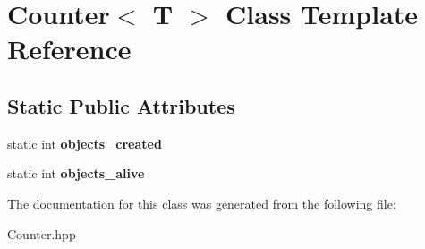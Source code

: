\hypertarget{class_counter}{}\section{Counter$<$ T $>$ Class Template Reference}
\label{class_counter}
\subsection*{Static Public Attributes}
\begin{DoxyCompactItemize}
\item 
\mbox{\label{class_counter_ad12b6b79bbfd93d7d05a87f38c29158c}} 
static int {\bfseries objects\+\_\+created}
\item 
\mbox{\label{class_counter_a109155a8c23546613e6e37ef8d49f8e4}} 
static int {\bfseries objects\+\_\+alive}
\end{DoxyCompactItemize}


The documentation for this class was generated from the following file\+:\begin{DoxyCompactItemize}
\item 
Counter.\+hpp\end{DoxyCompactItemize}
